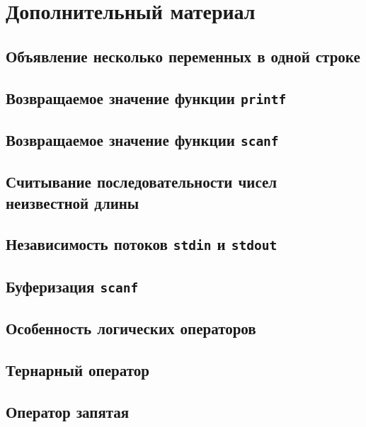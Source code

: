 \documentclass{article}
\begin{document}
\section*{Дополнительный материал}
\subsection*{Объявление несколько переменных в одной строке}
\subsection*{Возвращаемое значение функции \texttt{printf}}
\subsection*{Возвращаемое значение функции \texttt{scanf}}
\subsection*{Считывание последовательности чисел неизвестной длины}

\subsection*{Независимость потоков \texttt{stdin} и \texttt{stdout}}

\subsection*{Буферизация \texttt{scanf}}

\subsection*{Особенность логических операторов}
\subsection*{Тернарный оператор}
\subsection*{Оператор запятая}
\end{document}
